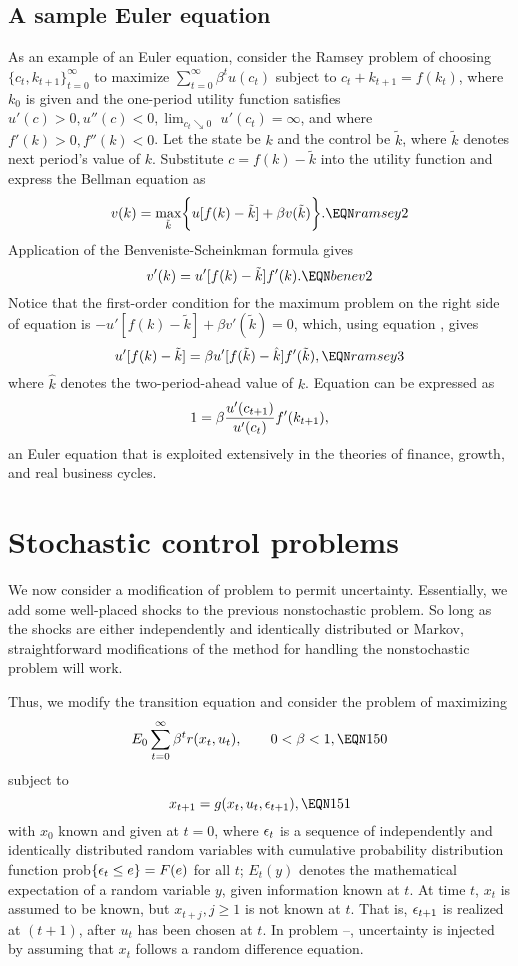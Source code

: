\subsection{A sample Euler equation}
As an example of an Euler equation,
 consider the Ramsey problem of choosing
$\{c_t, k_{t+1}\}_{t=0}^\infty$ to  maximize
$\sum_{t=0}^\infty \beta^t u(c_t)$ subject to
$c_t + k_{t+1} = f(k_t)$, where $k_0$ is given and
the one-period utility function satisfies
$u'(c) >0, u''(c) < 0, \lim_{c_t \searrow 0}$
$u'(c_t) = \infty$, and where $f'(k) >0, f''(k) <0$.
Let the state be $k$ and the control be $\tilde k$, where $\tilde k$ denotes
next period's value of $k$.  Substitute $c= f(k) -\tilde k$
into the utility function and express the Bellman equation
as
$$ v(k) = \max_{\tilde k} \biggl\{u[f(k) - \tilde k] + \beta v(\tilde k)\biggr\}. \EQN ramsey2$$
Application of the    Benveniste-Scheinkman formula
gives
$$v'(k) = u'[f(k) - \tilde k] f'(k). \EQN benev2$$
Notice that the first-order condition for the maximum problem
on the right side of equation   is
$ - u'[f(k)-\tilde k] + \beta v'(\tilde k) =0$, which, using equation
, gives
$$ u'[f(k) - \tilde k] = \beta u'[f(\tilde k)- \hat k] f'(\tilde k), \EQN ramsey3 $$
\eject  %
\noindent     %
where $\hat k$ denotes the two-period-ahead value of $k$.
Equation  can be expressed
as
$$ 1 = \beta {u'(c_{t+1})\over u'(c_t)} f'(k_{t+1}), $$
an Euler equation  that is exploited extensively in the theories
of finance, growth, and real business cycles.



\section{Stochastic control problems}
 We now consider a modification of problem  to permit uncertainty.
Essentially, we add some well-placed shocks to the previous
nonstochastic problem. So long as the shocks are either
independently and identically distributed or Markov,  straightforward
modifications of the  method for handling the nonstochastic problem
will work.


Thus, we modify the transition equation and consider
the problem of maximizing
$$E_0 \sum_{t=0}^\infty \be^t r(x_t,u_t),\qquad 0<\be<1,\EQN 150$$
subject to
$$x_{\toone} =g(x_t,u_t,\eps_{\toone}),\EQN 151$$
with
$x_0$ known and given at $t=0$, where ${\epsilon}_t$ is a sequence of independently
and identically distributed random variables with cumulative probability
distribution function prob$\{{\epsilon}_t\le e\} =F(e)$ for all $t$; $E_t(y)$ denotes
the mathematical expectation of a random variable $y$, given information known
at $t$.  At time $t$, $x_t$ is assumed to be known, but $x_{t+j}, j\ge 1$ is
not known at $t$.  That is, ${\epsilon}_{t+1}$ is realized at $(t+1)$, after $u_t$
has been chosen at $t$.  In problem --, uncertainty is
injected by
assuming that $x_t$ follows a random difference equation.

